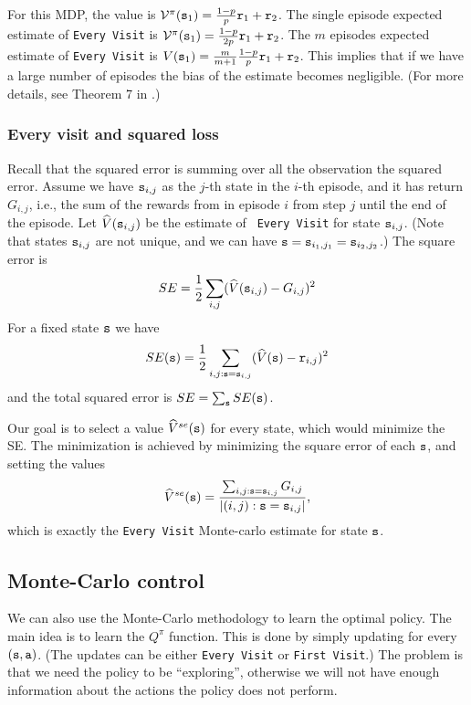 For this MDP, the value is
$\mathcal{V}^\pi({\tt s}_1)=\frac{1-p}{p}{\tt r}_1+{\tt r}_2$. The single
episode expected estimate of {\tt Every Visit} is
$\mathcal{V}^\pi({\tt s}_1)=\frac{1-p}{2p}{\tt r}_1+{\tt r}_2$. The $m$
episodes expected estimate of {\tt Every Visit} is
$V({\tt s}_1)=\frac{m}{m+1}\frac{1-p}{p}{\tt r}_1+{\tt r}_2$. This
implies that if we have a large number of episodes the bias of the
estimate becomes negligible. (For more details, see Theorem 7 in
\cite{SinghS96}.)

\subsubsection*{Every visit and squared loss}

Recall that the squared error is summing over all the observation
the squared error. Assume we have ${\tt s}_{i,j}$ as the $j$-th state
in the $i$-th episode, and it has return $G_{i,j}$, i.e., the sum of
the rewards from in episode $i$ from step $j$ until the end of the
episode. Let $\widehat{V}({\tt s}_{i,j})$ be the estimate of {\tt
Every Visit} for state ${\tt s}_{i,j}$. (Note that states
${\tt s}_{i,j}$ are not unique, and we can have
${\tt s}={\tt s}_{i_1,j_1}={\tt s}_{i_2,j_2}$.) The square error is
\[
SE=\frac{1}{2}\sum_{i,j} (\widehat{V}({\tt s}_{i,j})-G_{i,j})^2
\]
For a fixed state ${\tt s}$ we have
\[
SE({\tt s})=\frac{1}{2}\sum_{i,j:{\tt s}={\tt s}_{i,j}}
(\widehat{V}({\tt s})-{\tt r}_{i,j})^2
\]
and the total squared error is $SE=\sum_{\tt s} SE({\tt s})$.

Our goal is to select a value $\widehat{V}^{se}({\tt s})$ for every
state, which would minimize the SE. The minimization is achieved by
minimizing the square error of each ${\tt s}$, and setting the values
\[
\widehat{V}^{se}({\tt s})=\frac{\sum_{i,j:{\tt s}={\tt s}_{i,j}}
G_{i,j}}{|{(i,j):{\tt s}={\tt s}_{i,j}}|},
\]
which is exactly the {\tt Every Visit} Monte-carlo estimate for
state ${\tt s}$.

\subsection{Monte-Carlo control}

We can also use the Monte-Carlo methodology to learn the optimal
policy.
%
The main idea is to learn the $Q^\pi$ function. This is done by
simply updating for every $({\tt s},{\tt a})$. (The updates can be
either {\tt Every Visit} or {\tt First Visit}.) The problem is that
we need the policy to be ``exploring'', otherwise we will not have
enough information about the actions the policy does not perform.

